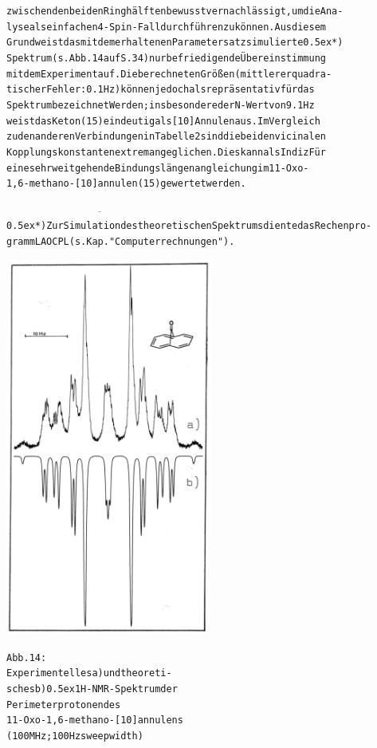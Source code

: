 \documentclass[a4paper,11pt]{article}
\begin{document}
\begin{alltt}
zwischen den beiden Ringhälften bewusst vernachlässigt, um die Ana-
lyse als einfachen 4-Spin-Fall durchführen zu können. Aus diesem
Grund weist das mit dem erhaltenen Parametersatz simulierte \leavevmode\raise0.5ex\hbox{*})
Spektrum (s. Abb. 14 auf S. 34) nur befriedigende Übereinstimmung
mit dem Experiment auf. Die berechneten Größen (mittlerer quadra-
tischer Fehler: 0.1 Hz) können jedoch als repräsentativ für das
Spektrum bezeichnet Werden; insbesondere der N-Wert von 9.1 Hz
weist das Keton (15) eindeutig als [10]Annulen aus. Im Vergleich
zu den anderen Verbindungen in Tabelle 2 sind die beiden vicinalen
Kopplungskonstanten extrem angeglichen. Dies kann als Indiz Für
eine sehr weitgehende Bindungslängenangleichung im 11-Oxo-
1,6-methano-[10]annulen (15) gewertet werden.

\(\overline{\hspace{7cm}}\)
\leavevmode\raise0.5ex\hbox{*}) Zur Simulation des theoretischen Spektrums diente das Rechenpro-
   gramm LAOCPL (s. Kap. "Computerrechnungen").
\newpage
{} 


\end{alltt}
\begin{minipage}{7.5cm}
  \includegraphics[width=6.79cm]{ESR_014}
\end{minipage}%
\begin{minipage}{0.5\textwidth}
\begin{alltt}
Abb. 14:
Experimentelles a) und theoreti-
sches b) \raise0.5ex\hbox{1}H-NMR-Spektrum der
Perimeterprotonen des
11-Oxo-1,6-methano-[10]annulens
(100 MHz; 100 Hz sweep width)
\end{alltt}
\end{minipage}
\end{document}
